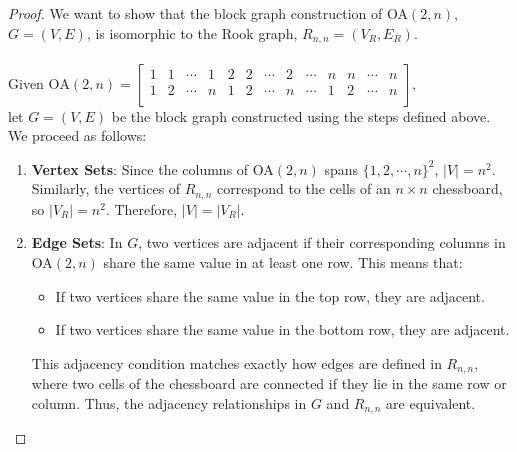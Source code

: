 \documentclass{article}
\begin{document}
\begin{proof} 
We want to show that the block graph construction of OA\((2,n)\), \(G = (V,E)\), is isomorphic to the Rook graph, \(R_{n,n} = (V_R, E_R)\). \\ \\
Given 
\(
\text{OA}(2, n) = \begin{bmatrix}
    1 & 1 & \cdots & 1 & 2 & 2 & \cdots & 2 & \cdots & n & n & \cdots & n \\
    1 & 2 & \cdots & n & 1 & 2 & \cdots & n & \cdots & 1 & 2 & \cdots & n \\
\end{bmatrix},
\) \\
let $G = (V,E)$ be the block graph constructed using the steps defined above. \\

We proceed as follows:
\begin{enumerate}
    \item \textbf{Vertex Sets}: 
    Since the columns of OA\((2,n)\) spans \(\{1,2,\cdots,n\}^2\), \(|V| = n^2\). Similarly, the vertices of \(R_{n,n}\) correspond to the cells of an \(n \times n\) chessboard, so \(|V_R| = n^2\). Therefore, \(|V| = |V_R|\).

    \item \textbf{Edge Sets}: 
    In \(G\), two vertices are adjacent if their corresponding columns in OA\((2,n)\) share the same value in at least one row. This means that:
    \begin{itemize}
        \item If two vertices share the same value in the top row, they are adjacent.
        \item If two vertices share the same value in the bottom row, they are adjacent.
    \end{itemize}
    This adjacency condition matches exactly how edges are defined in \(R_{n,n}\), where two cells of the chessboard are connected if they lie in the same row or column. Thus, the adjacency relationships in \(G\) and \(R_{n,n}\) are equivalent.


\end{enumerate}
\end{proof}
\end{document}
